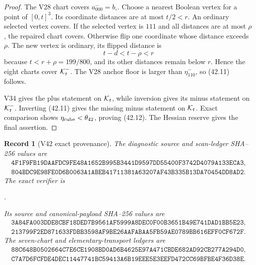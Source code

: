 \documentclass[11pt,oneside]{article}
\newtheorem{record}[theorem]{Record}
\theoremstyle{definition}
\theoremstyle{remark}
\begin{document}
\begin{proof}
The V28 chart covers \(a_{000}^-=b_\circ\).  Choose a nearest
Boolean vertex for a point of \([0,t]^3\).  Its coordinate
distances are at most \(t/2<r\).  An ordinary selected vertex
covers.  If the selected vertex is \(111\) and all distances are at
most \(\rho\), the repaired chart covers.  Otherwise flip one
coordinate whose distance exceeds \(\rho\).  The new vertex is
ordinary, its flipped distance is
\[
 t-d<t-\rho<r
\]
because \(t<r+\rho=199/800\), and its other distances remain below
\(r\).  Hence the eight charts cover \({\cal K}_t^-\).
The V28 anchor floor is larger than \(\eta_{110}^-\), so (42.11)
follows.

V34 gives the plus statement on \({\cal K}_t\), while inversion
gives its minus statement on \({\cal K}_t^-\).  Inverting (42.11)
gives the missing minus statement on \({\cal K}_t\).  Exact
comparison shows \(\eta_{\rm cube}<\theta_{42}\), proving (42.12).
The Hessian reserve gives the final assertion.
\end{proof}

\begin{record}[V42 exact provenance]
\label{rec:newv42-provenance}
The diagnostic source and scan-ledger SHA--256 values are
\[
\begin{gathered}
\texttt{4F1F9FB19DAAFDC9FE48A1652B995B3441D9597DD55400F3742D4079A133ECA3},\\
\texttt{804BDC9E98FE0D6B0063A1ABEB41711381A63207AF43B335B13DA70454DD8AD2}.
\end{gathered}                                         \tag{42.13}
\]
The exact verifier is
\begin{center}
\footnotesize
{}.
\end{center}
Its source and canonical-payload SHA--256 values are
\[
\begin{gathered}
\texttt{3A84FA003DDE8CBF18DED7B9561AF5999A8DEC0F00B3651B49E741DAD1BB5E23},\\
\texttt{213799F2ED871633FDBB3598AF9BE26AAFABAA5FB59AE0789BB616EFF0CF672F}.
\end{gathered}                                         \tag{42.14}
\]
The seven-chart and elementary-transport ledgers are
\[
\begin{gathered}
\texttt{88C648B0502664C7E6CE1908BD0AD6B4625E97A471CBDE682AD92CB277A294D0},\\
\texttt{C7A7D6FCFDE4DEC11447741BC59413A6B19EEE5E3EEFD472CC69BFBE4F36D38E}.
\end{gathered}                                         \tag{42.15}
\]
\end{record}
\end{document}
